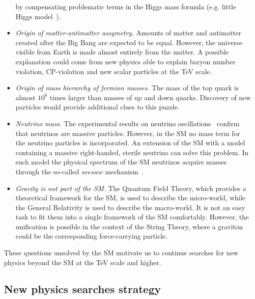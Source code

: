 \begin{itemize}
by compensating problematic terms in the Higgs mass formula (e.g. little Higgs model~\cite{Brak}).
\item \textit{Origin of matter-antimatter assymetry.} Amounts of matter and antimatter created after the Big Bang are expected to be equal. However, the universe visible from Earth is made almost entirely from the matter.
A possible explanation could come from new physics able to explain baryon number violation, CP-violation and new scalar particles at the TeV scale.
\item \textit{Origin of mass hierarchy of fermion masses.} The mass of the top quark is almost $10^6$ times larger than masses of up and down quarks. Discovery of new particles would provide additional clues to this puzzle.
\item \textit{Neutrino mass.} The experimental results on neutrino oscillations~\cite{Fukuda:1998fd} confirm that neutrinos are massive particles. However, in the SM no mass term for the neutrino particles is incorporated. An extension of the SM with a model containing a massive right-handed, sterile neutrino can solve this problem. In such model the physical spectrum of the SM neutrinos acquire masses through the so-called $seesaw$ mechanism~\cite{Mohapatra:1979ia}.
\item \textit{Gravity is not part of the SM.} The Quantum Field Theory, which provides a theoretical framework for the SM, is used to describe the micro-world, while the General Relativity is used to describe the macro-world. It is not an easy task to fit them into a single framework of the SM comfortably. However, the unification is possible in the context of the String Theory, where a graviton could be the corresponding force-carrying particle.
\end{itemize}


These questions unsolved by the SM motivate us to continue searches for new physics beyond the SM at the TeV scale and higher.

\subsection{New physics searches strategy}

